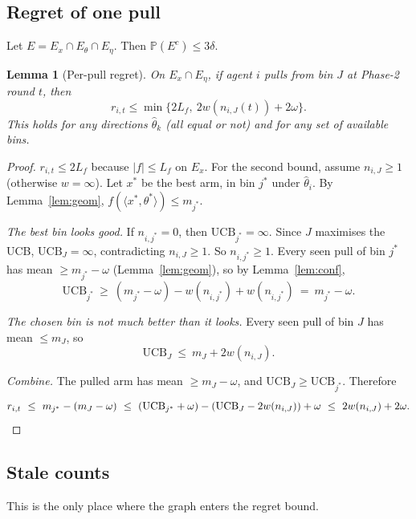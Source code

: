 \documentclass[11pt]{article}
\newtheorem{lemma}[theorem]{Lemma}
\theoremstyle{definition}
\newcommand{\Prob}{\mathbb{P}}
\newcommand{\UCB}{\mathrm{UCB}}
\begin{document}
\subsection{Regret of one pull}

Let $E=E_x\cap E_\theta\cap E_\eta$. Then $\Prob(E^c)\le3\delta$.

\begin{lemma}[Per-pull regret]\label{lem:perpull}
On $E_x\cap E_\eta$, if agent $i$ pulls from bin $J$ at Phase-2 round $t$, then
\[
r_{i,t}\le\min\big\{2L_f,\ 2w(n_{i,J}(t))+2\omega\big\}.
\]
This holds for any directions $\hat\theta_k$ (all equal or not) and for any set of available bins.
\end{lemma}
\begin{proof}
$r_{i,t}\le2L_f$ because $|f|\le L_f$ on $E_x$. For the second bound, assume $n_{i,J}\ge1$ (otherwise $w=\infty$).
Let $x^*$ be the best arm, in bin $j^*$ under $\hat\theta_i$. By Lemma~\ref{lem:geom}, $f(\langle x^*,\theta^*\rangle)\le m_{j^*}$.

\emph{The best bin looks good.} If $n_{i,j^*}=0$, then $\UCB_{j^*}=\infty$. Since $J$ maximises the UCB,
$\UCB_J=\infty$, contradicting $n_{i,J}\ge1$. So $n_{i,j^*}\ge1$. Every seen pull of bin $j^*$ has mean
$\ge m_{j^*}-\omega$ (Lemma~\ref{lem:geom}), so by Lemma~\ref{lem:conf},
\[
\UCB_{j^*}\ \ge\ (m_{j^*}-\omega)-w(n_{i,j^*})+w(n_{i,j^*})\ =\ m_{j^*}-\omega.
\]

\emph{The chosen bin is not much better than it looks.} Every seen pull of bin $J$ has mean $\le m_J$, so
\[
\UCB_J\ \le\ m_J+2w(n_{i,J}).
\]

\emph{Combine.} The pulled arm has mean $\ge m_J-\omega$, and $\UCB_J\ge\UCB_{j^*}$. Therefore
\[
r_{i,t}\ \le\ m_{j^*}-(m_J-\omega)\ \le\ (\UCB_{j^*}+\omega)-(\UCB_J-2w(n_{i,J}))+\omega\ \le\ 2w(n_{i,J})+2\omega.\qedhere
\]
\end{proof}

\subsection{Stale counts}

This is the only place where the graph enters the regret bound.
\end{document}
